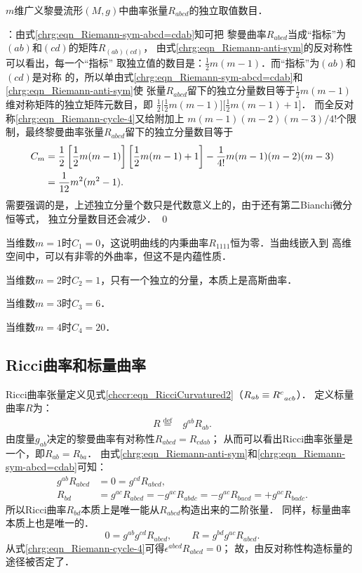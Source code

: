 \begin{example}
    $m$维广义黎曼流形$(M,g)$中曲率张量$R_{abcd}$的独立取值数目．
\end{example}
：由式\eqref{chrg:eqn_Riemann-sym-abcd=cdab}知可把
黎曼曲率$R_{abcd}$当成“指标”为$(ab)$和$(cd)$的矩阵$R_{(ab)(cd)}$，
由式\eqref{chrg:eqn_Riemann-anti-sym}的反对称性可以看出，每一个“指标”
取独立值的数目是：$\frac{1}{2}m(m-1)$．而“指标”为$(ab)$和$(cd)$是对称
的，所以单由式\eqref{chrg:eqn_Riemann-sym-abcd=cdab}和\eqref{chrg:eqn_Riemann-anti-sym}使
张量$R_{abcd}$留下的独立分量数目等于$\frac{1}{2}m(m-1)$维对称矩阵的独立矩阵元数目，即
$\frac{1}{2}\bigl[\frac{1}{2}m(m-1)\bigr] \bigl[\frac{1}{2}m(m-1)+1\bigr]$．
而全反对称\eqref{chrg:eqn_Riemann-cycle-4}又给附加上
$m(m-1)(m-2)(m-3)/4!$个限制，最终黎曼曲率张量$R_{abcd}$留下的独立分量数目等于
\begin{align}
    C_m &= \frac{1}{2}\left[\frac{1}{2}m(m-1)\right] \left[\frac{1}{2}m(m-1)+1\right]
             - \frac{1}{4!}m(m-1)(m-2)(m-3)  \notag\\
      &= \frac{1}{12} m^2(m^2-1) . \label{chrg:eqn_Number-Of-Riemannd4}
\end{align}
需要强调的是，上述独立分量个数只是代数意义上的，由于还有第二Bianchi微分恒等式，
独立分量数目还会减少． \qed

当维数$m=1$时$C_1=0$，这说明曲线的内秉曲率$R_{1111}$恒为零．当曲线嵌入到
高维空间中，可以有非零的外曲率，但这不是内蕴性质． %

当维数$m=2$时$C_2=1$，只有一个独立的分量，本质上是高斯曲率． 

当维数$m=3$时$C_3=6$．

当维数$m=4$时$C_4=20$．



\subsection{Ricci曲率和标量曲率}
Ricci曲率张量定义见式\eqref{chccr:eqn_RicciCurvatured2}（$R_{ab}\equiv R^c_{\hphantom{a}acb}$）．
定义标量曲率$R$为：
\begin{align}
    R \overset{\mathrm {def}}{=}& g^{ab} R_{ab}. \label{chrg:eqn_ScalarCurvature}
\end{align}
由度量$g_{ab}$决定的黎曼曲率有对称性$R_{abcd}=R_{cdab}$；
从而可以看出Ricci曲率张量是一个，即$R_{ab}=R_{ba}$．
由式\eqref{chrg:eqn_Riemann-anti-sym}和\eqref{chrg:eqn_Riemann-sym-abcd=cdab}可知：
\begin{align*}
    g^{ab}R_{abcd} &=0= g^{cd}R_{abcd}, \\
    R_{bd} & = g^{ac}R_{abcd} = -g^{ac}R_{abdc} = -g^{ac}R_{bacd} = + g^{ac}R_{badc} .
\end{align*}
所以Ricci曲率$R_{bd}$本质上是唯一能从$R_{abcd}$构造出来的二阶张量．
同样，标量曲率本质上也是唯一的．
\begin{equation*}
    0 = g^{ab} g^{cd}R_{abcd}, \qquad     R  = g^{bd} g^{ac}R_{abcd} .
\end{equation*}
从式\eqref{chrg:eqn_Riemann-cycle-4}可得$\epsilon^{abcd}R_{abcd} =0$；
故，由反对称性构造标量的途径被否定了．




